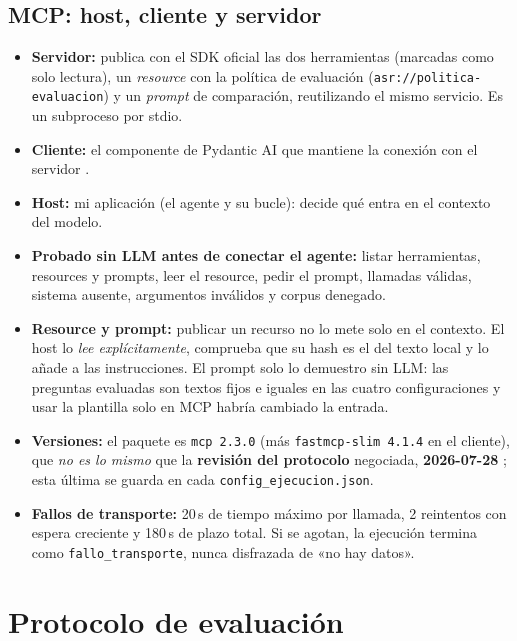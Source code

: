 \documentclass[10pt,a4paper]{article}
\newcommand{\cod}[1]{\texttt{\small #1}}
\begin{document}
\subsection{MCP: host, cliente y servidor}\label{sec:mcp}
\begin{itemize}
\item \textbf{Servidor:} publica con el SDK oficial \cite{mcpsdk,mcpserver} las dos herramientas (marcadas como solo lectura), un \emph{resource} con la política de evaluación (\cod{asr://politica-evaluacion}) y un \emph{prompt} de comparación, reutilizando el mismo servicio. Es un subproceso por stdio.
\item \textbf{Cliente:} el componente de Pydantic AI que mantiene la conexión con el servidor \cite{paimcp}.
\item \textbf{Host:} mi aplicación (el agente y su bucle): decide qué entra en el contexto del modelo.
\item \textbf{Probado sin LLM antes de conectar el agente:} listar herramientas, resources y prompts, leer el resource, pedir el prompt, llamadas válidas, sistema ausente, argumentos inválidos y corpus denegado.
\item \textbf{Resource y prompt:} publicar un recurso no lo mete solo en el contexto. El host lo \emph{lee explícitamente}, comprueba que su hash es el del texto local y lo añade a las instrucciones. El prompt solo lo demuestro sin LLM: las preguntas evaluadas son textos fijos e iguales en las cuatro configuraciones y usar la plantilla solo en MCP habría cambiado la entrada.
\item \textbf{Versiones:} el paquete es \cod{mcp 2.3.0} (más \cod{fastmcp-slim 4.1.4} en el cliente), que \emph{no es lo mismo} que la \textbf{revisión del protocolo} negociada, \textbf{2026-07-28} \cite{mcpspec}; esta última se guarda en cada \cod{config\_ejecucion.json}.
\item \textbf{Fallos de transporte:} 20\,s de tiempo máximo por llamada, 2 reintentos con espera creciente y 180\,s de plazo total. Si se agotan, la ejecución termina como \cod{fallo\_transporte}, nunca disfrazada de «no hay datos».
\end{itemize}

\section{Protocolo de evaluación}
\end{document}
